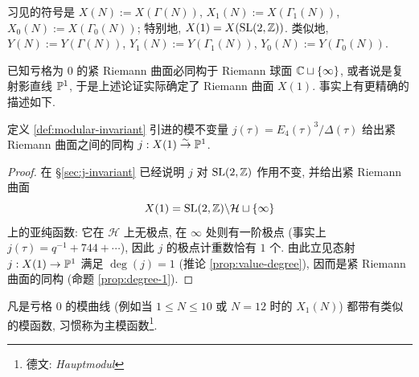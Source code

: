 \begin{convention}  
	习见的符号是 $X(N) := X(\Gamma(N))$, $X_1(N) := X(\Gamma_1(N))$, $X_0(N) := X(\Gamma_0(N))$; 特别地, $X(1) = X(\operatorname{SL}(2,\mathbb{Z}))$. 类似地, $Y(N) := Y(\Gamma(N))$, $Y_1(N) := Y(\Gamma_1(N))$, $Y_0(N) := Y(\Gamma_0(N))$.
\end{convention}

已知亏格为 $0$ 的紧 Riemann 曲面必同构于 Riemann 球面 $\mathbb{C} \sqcup \{\infty\}$, 或者说是复射影直线 $\mathbb{P}^1$, 于是上述论证实际确定了 Riemann 曲面 $X(1)$. 事实上有更精确的描述如下.

\begin{theorem}\label{prop:j-Hauptmodul}
	定义 \ref{def:modular-invariant} 引进的模不变量 $j(\tau) = E_4(\tau)^3/\Delta(\tau)$ 给出紧 Riemann 曲面之间的同构 $j: X(1) \stackrel{\sim}{\rightarrow} \mathbb{P}^1$.
\end{theorem}
\begin{proof}
	在 \S\ref{sec:j-invariant} 已经说明 $j$ 对 $\operatorname{SL}(2,\mathbb{Z})$ 作用不变, 并给出紧 Riemann 曲面
	\[ X(1) = \operatorname{SL}(2,\mathbb{Z}) \backslash \mathcal{H} \sqcup \{\infty\} \]
	上的亚纯函数: 它在 $\mathcal{H}$ 上无极点, 在 $\infty$ 处则有一阶极点 (事实上 $j(\tau) = q^{-1} + 744 + \cdots$), 因此 $j$ 的极点计重数恰有 $1$ 个. 由此立见态射 $j: X(1) \to \mathbb{P}^1$ 满足 $\deg(j) = 1$ (推论 \ref{prop:value-degree}), 因而是紧 Riemann 曲面的同构 (命题 \ref{prop:degree-1}).
\end{proof}

凡是亏格 $0$ 的模曲线 (例如当 $1 \leq N \leq 10$ 或 $N=12$ 时的 $X_1(N)$) 都带有类似的模函数, 习惯称为主模函数\footnote{德文: \textit{Hauptmodul}}.

